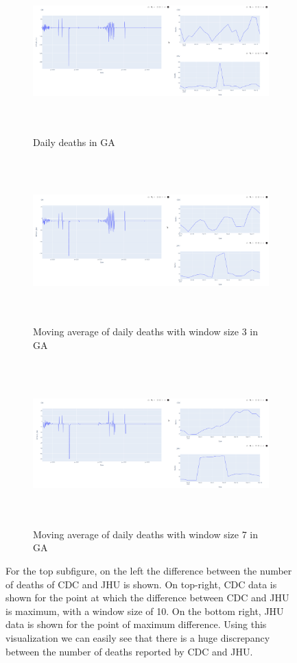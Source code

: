 \documentclass[11pt,twocolumn,letterpaper]{article}
\begin{document}
\begin{figure}
\centering
\begin{subfigure}{\linewidth}
    \centering
    \includegraphics[width=\linewidth, height=6.3cm]{images/orig_avg_1_ga.png}
    \caption{Daily deaths in GA}
\end{subfigure}
\hfill
\begin{subfigure}{\linewidth}
    \centering
    \includegraphics[width=\linewidth, height=6.3cm]{images/orig_avg_3_ga.png}
    \caption{Moving average of daily deaths with window size 3 in GA}
    \vfill
\end{subfigure}
\begin{subfigure}{\linewidth}
    \centering
    \includegraphics[width=\linewidth, height=6.3cm]{images/orig_avg_7_ga.png}
    \caption{Moving average of daily deaths with window size 7 in GA}
    \vfill
\end{subfigure}
\caption{For the top subfigure, on the left the difference between the number of deaths of CDC and JHU is shown. On top-right, CDC data is shown for the point at which the difference between CDC and JHU is maximum, with a window size of 10. On the bottom right, JHU data is shown for the point of maximum difference. Using this visualization we can easily see that there is a huge discrepancy between the number of deaths reported by CDC and JHU.}
\label{figure1}
\end{figure}
\end{document}
